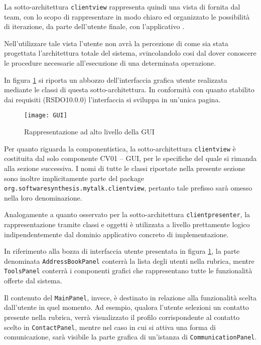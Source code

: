 La sotto-architettura \texttt{clientview} rappresenta quindi una vista di  fornita dal team, con lo scopo di rappresentare in modo chiaro ed organizzato le possibilità di iterazione, da parte dell'utente finale, con l'applicativo \caName.

Nell'utilizzare tale vista l'utente non avrà la percezione di come sia stata progettata l'architettura totale del sistema, svincolandolo cosi dal dover conoscere le procedure necessarie all'esecuzione di una determinata operazione.

In figura \ref{fig:gui} si riporta un abbozzo dell'interfaccia grafica utente realizzata mediante le classi di questa sotto-architettura. In conformità con quanto stabilito dai requisiti (RSDO10.0.0) l'interfaccia si sviluppa in un'unica pagina.

\begin{figure}[h]
  \centering
  \texttt{[image: GUI]}
  \caption{Rappresentazione ad alto livello della GUI}\label{fig:gui}
\end{figure}

Per quanto riguarda la componentistica, la sotto-architettura \texttt{clientview} è costituita dal solo componente \textsf{CV01 -- GUI}, per le specifiche del quale si rimanda alla sezione successiva. I nomi di tutte le classi riportate nella presente sezione sono inoltre implicitamente parte del package \texttt{org.softwaresynthesis.mytalk.clientview}, pertanto tale prefisso sarà omesso nella loro denominazione.

Analogamente a quanto osservato per la sotto-architettura \texttt{clientpresenter}, la rappresentazione tramite classi e oggetti è utilizzata a livello prettamente logico indipendentemente dal dominio applicativo concreto di implementazione.

In riferimento alla bozza di interfaccia utente presentata in figura \ref{fig:gui}, la parte denominata \texttt{AddressBookPanel} conterrà la lista degli utenti nella rubrica, mentre \texttt{ToolsPanel} conterrà i componenti grafici che rappresentano tutte le funzionalità offerte dal sistema. 

Il contenuto del \texttt{MainPanel}, invece, è destinato in relazione alla funzionalità scelta dall'utente in quel momento. Ad esempio, qualora l'utente selezioni un contatto presente nella rubrica, verrà visualizzato il profilo corrispondente al contatto scelto in \texttt{ContactPanel}, mentre nel caso in cui si attiva una forma di comunicazione, sarà visibile la parte grafica di un'istanza di \texttt{CommunicationPanel}.

